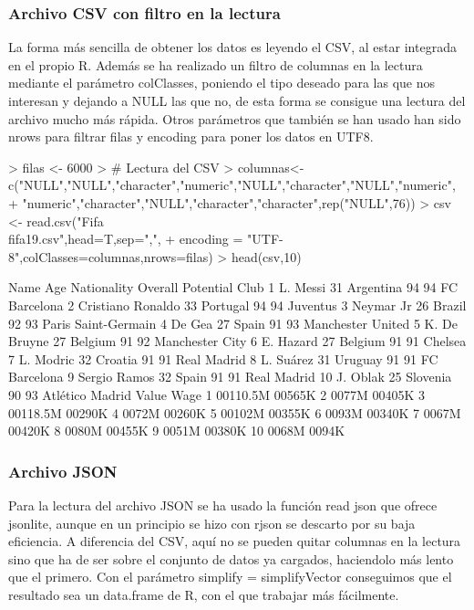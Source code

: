 \documentclass [a4paper] {article}
\begin{document}
\subsubsection{Archivo CSV con filtro en la lectura}
La forma más sencilla de obtener los datos es leyendo el CSV, al estar integrada en el propio R.
Además se ha realizado un filtro de columnas en la lectura mediante el parámetro colClasses, poniendo el tipo deseado para las que nos interesan 
y dejando a NULL las que no, de esta forma
se consigue una lectura del archivo mucho más rápida. Otros parámetros que también se han usado han sido nrows para filtrar filas y encoding 
para poner los datos en UTF8.

\begin{Schunk}
\begin{Sinput}
> filas <- 6000
> # Lectura del CSV
> columnas<-c("NULL","NULL","character","numeric","NULL","character","NULL","numeric",
+ "numeric","character","NULL","character","character",rep("NULL",76))
> csv <- read.csv("Fifa\\fifa19.csv",head=T,sep=",",
+ encoding = "UTF-8",colClasses=columnas,nrows=filas)
> head(csv,10)
\end{Sinput}
\begin{Soutput}
                Name Age Nationality Overall Potential                Club
1           L. Messi  31   Argentina      94        94        FC Barcelona
2  Cristiano Ronaldo  33    Portugal      94        94            Juventus
3          Neymar Jr  26      Brazil      92        93 Paris Saint-Germain
4             De Gea  27       Spain      91        93   Manchester United
5       K. De Bruyne  27     Belgium      91        92     Manchester City
6          E. Hazard  27     Belgium      91        91             Chelsea
7          L. Modric  32     Croatia      91        91         Real Madrid
8          L. Suárez  31     Uruguay      91        91        FC Barcelona
9       Sergio Ramos  32       Spain      91        91         Real Madrid
10          J. Oblak  25    Slovenia      90        93     Atlético Madrid
     Value  Wage
1  \200110.5M \200565K
2     \20077M \200405K
3  \200118.5M \200290K
4     \20072M \200260K
5    \200102M \200355K
6     \20093M \200340K
7     \20067M \200420K
8     \20080M \200455K
9     \20051M \200380K
10    \20068M  \20094K
\end{Soutput}
\end{Schunk}

\subsubsection{Archivo JSON}
Para la lectura del archivo JSON se ha usado la función read json que ofrece jsonlite, aunque en un principio se hizo con rjson se descarto por su baja eficiencia. 
A diferencia del CSV, aquí no se pueden quitar columnas en la lectura sino que ha de ser sobre 
el conjunto de datos ya cargados, haciendolo más lento que el primero. Con el parámetro simplify = simplifyVector 
conseguimos que el resultado sea un data.frame de R, con el que trabajar más fácilmente. 
\end{document}
